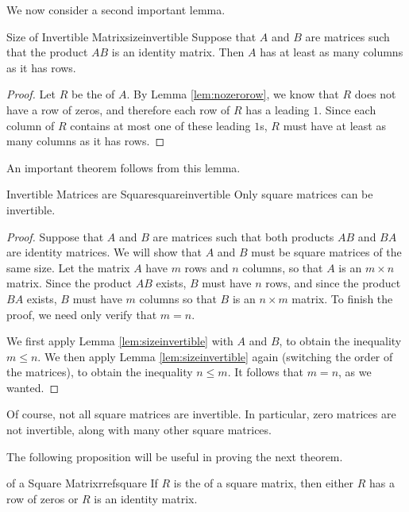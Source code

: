 We now consider a second important lemma.

\begin{lemma}{Size of Invertible Matrix}{sizeinvertible}
Suppose that $A$ and $B$ are matrices such that the product $AB$ is an identity matrix. Then $A$ has at least as many columns as it has rows.
\end{lemma}

\begin{proof}
Let $R$ be the {\rref} of $A$. By Lemma \ref{lem:nozerorow}, we know that $R$ does not have a row of zeros, and therefore each row of $R$ has a leading $1$. Since each column of $R$ contains at most one of these leading $1$s, $R$ must have at least as many columns as it has rows.
\end{proof}

An important theorem follows from this lemma. 

\begin{theorem}{Invertible Matrices are Square}{squareinvertible}
Only square matrices can be invertible.
\end{theorem}

\begin{proof}
Suppose that $A$ and $B$ are matrices such that both products $AB$ and $BA$ are identity matrices. We will show that $A$ and $B$ must be square matrices of the same size. Let the matrix $A$ have $m$ rows and $n$ columns, so that $A$ is an $m \times n$ matrix. Since the product $AB$ exists, $B$ must have $n$ rows, and since the product $BA$ exists, $B$ must have $m$ columns so that $B$ is an $n \times m$ matrix. To finish the proof, we need only verify that $m=n$. 

We first apply Lemma \ref{lem:sizeinvertible} with $A$ and $B$, to obtain the inequality $m \leq n$. We then apply Lemma \ref{lem:sizeinvertible} again (switching the order of the matrices), to obtain the inequality $n \leq m$. It follows that $m=n$, as we wanted.
\end{proof}

Of course, not all square matrices are invertible. In particular, zero matrices are not invertible, along with many other square matrices. 

The following proposition will be useful in proving the next theorem.

\begin{proposition}{{\RREF} of a Square Matrix}{rrefsquare}
If $R$ is the {\rref} of a square matrix, then either $R$ has a row of zeros or $R$ is an identity matrix. 
\end{proposition}

